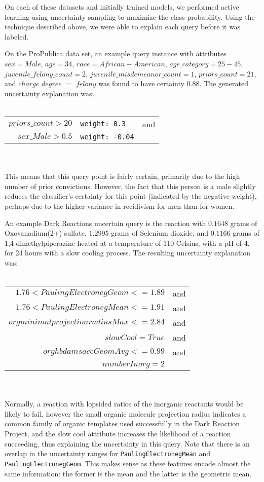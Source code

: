 On each of these datasets and initially trained models, we performed active learning using uncertainty sampling to maximize the class probability. Using the technique described above, we were able to explain each query before it was labeled. 

On the ProPublica data set, an example query instance with attributes $sex = Male$, $age=34$, $race=African-American$, $age\_category=25 - 45$, $juvenile\_felony\_count=2$, $juvenile\_misdemeanor\_count=1$, $priors\_count = 21$, and $charge\_degree $ $=$ $ felony$ was found to have certainty $0.88$.  The generated uncertainty explanation was:
~\\~\\
\begin{tabular}{rll}
$priors\_count > 20$ & \texttt{weight: 0.3} & and \\
$sex\_Male > 0.5$ & \texttt{weight: -0.04} &
\end{tabular}
~\\~\\
\noindent This means that this query point is fairly certain, primarily due to the high number of prior convictions. 
However, the fact that this person is a male slightly reduces the classifier's certainty for this point (indicated by the negative weight), perhaps due to the higher variance in recidivism for men than for women.  

An example Dark Reactions uncertain query is the reaction with $0.1648$ grams of Oxovanadium(2+) sulfate, $1.2995$ grams of Selenium dioxide, and $0.1166$ grams of 1,4-dimethylpiperazine heated at a temperature of $110$ Celsius, with a pH of 4, for 24 hours with a slow cooling process.  The resulting uncertainty explanation was: 
~\\~\\
\begin{tabular}{rl}
$1.76 < PaulingElectronegGeom <= 1.89$ & and \\
$1.76 < PaulingElectronegMean <= 1.91$ & and \\
$orgminimalprojectionradiusMax <= 2.84$ & and \\
$slowCool = True$ & and \\
$orghbdamsaccGeomAvg <= 0.99$ & and \\
$numberInorg = 2$
\end{tabular}
~\\~\\
\noindent  Normally, a reaction with lopsided ratios of the inorganic reactants would be likely to fail, however the small organic molecule projection radius indicates a common family of organic templates used successfully in the Dark Reaction Project, and the slow cool attribute increases the likelihood of a reaction succeeding, thus explaining the uncertainty in this query.  Note that there is an overlap in the uncertainty ranges for \texttt{PaulingElectronegMean} and \texttt{PaulingElectronegGeom}. This makes sense as these features encode almost the same information: the former is the mean and the latter is the geometric mean.

